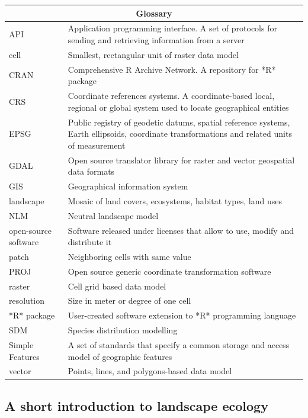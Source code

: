 \documentclass[smallextended]{svjour3}       %
\begin{document}
\begin{tabularx}{450pt}{lX}

\hline

\multicolumn{2}{c}{Glossary} \\

\hline

API & Application programming interface. A set of protocols for sending and retrieving information from a server \\
cell & Smallest, rectangular unit of raster data model \\
CRAN & Comprehensive R Archive Network. A repository for *R* package \\
CRS & Coordinate references systems. A coordinate-based local, regional or global system used to locate geographical entities \\
EPSG & Public registry of geodetic datums, spatial reference systems, Earth ellipsoids, coordinate transformations and related units of measurement \\
GDAL & Open source translator library for raster and vector geospatial data formats \\
GIS & Geographical information system \\
landscape & Mosaic of land covers, ecosystems, habitat types, land uses \\
NLM & Neutral landscape model \\
open-source software & Software released under licenses that allow to use, modify and distribute it \\
patch & Neighboring cells with same value \\
PROJ & Open source generic coordinate transformation software \\
raster & Cell grid based data model \\
resolution & Size in meter or degree of one cell \\
*R* package & User-created software extension to *R* programming language \\
SDM & Species distribution modelling \\
Simple Features & A set of standards that specify a common storage and access model of geographic features \\
vector & Points, lines, and polygons-based data model \\

\hline

\end{tabularx}

\hypertarget{sec:landscape_ecology}{%
\subsection{A short introduction to landscape ecology}\label{sec:landscape_ecology}}
\end{document}

